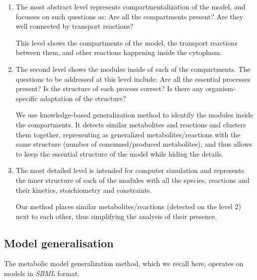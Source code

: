 \documentclass{bmcart}
\begin{document}
\begin{enumerate}
\item The most abstract level represents compartmentalization of the model, and focusses on such questions as: Are all the compartments present? Are they well connected by transport reactions?

This level shows the compartments of the model, the transport reactions between them, and other reactions happening inside the cytoplasm.

\item The second level shows the modules inside of each of the compartments. The questions to be addressed at this level include: Are all the essential processes present? Is the structure of each process correct? Is there any organism-specific adaptation of the structure?

We use knowledge-based generalization method to identify the modules inside the compartments. It detects similar metabolites and reactions and clusters them together, representing as generalized metabolites/reactions with the same structure (number of consumed/produced metabolites), and thus allows to keep the essential structure of the model while hiding the details.

\item The most detailed level is intended for computer simulation and represents the inner structure of each of the modules with all the species, reactions and their kinetics, stoichiometry and constraints.

Our method places similar metabolites/reactions (detected on the level 2) next to each other, thus simplifying the analysis of their presence.

\end{enumerate}

\subsection*{Model generalisation}
The metabolic model generalization method\cite{Zhukova2014}, which we recall here, operates on models in \textit{SBML}\cite{Hucka08} format.

\end{document}
